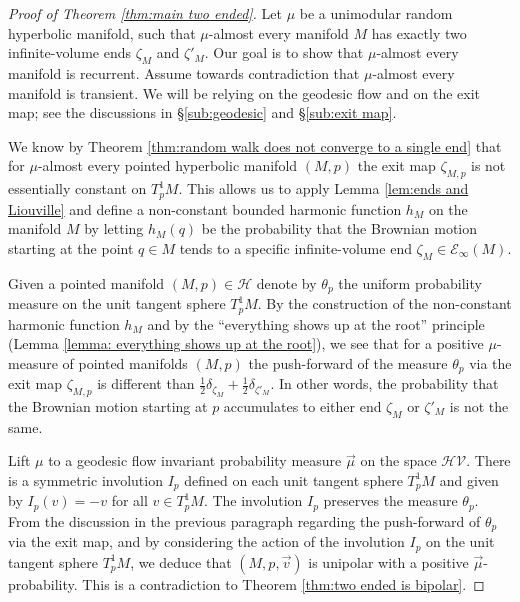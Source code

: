 \documentclass{amsart}
\newcommand{\Hypers}{\mathcal{H}}
\newcommand{\HypersV}{\mathcal{HV}}
\newcommand{\EndsInf}[1]{\mathcal{E}_{\infty}\left(#1\right)}
\theoremstyle{plain}
\numberwithin{equation}{section}
\theoremstyle{definition}
\begin{document}
\begin{proof}[Proof of Theorem \ref{thm:main two ended}]
Let $\mu$ be a unimodular random hyperbolic manifold, such that $\mu$-almost every manifold $M$ has exactly two infinite-volume ends $\zeta_M$ and $\zeta'_M$. 
Our goal is to show that $\mu$-almost every manifold is recurrent. Assume towards contradiction that $\mu$-almost every manifold is transient. 
We will be relying on the geodesic flow and on the exit map; see the discussions in \S\ref{sub:geodesic} and \S\ref{sub:exit map}.

We know by Theorem \ref{thm:random walk does not converge to a single end} that for $\mu$-almost every pointed hyperbolic manifold $(M,p)$ the exit map $\zeta_{M,p}$ is not essentially constant on $T^1_pM$.  This allows us to apply Lemma \ref{lem:ends and Liouville} and define a non-constant bounded harmonic function $h_M$ on the manifold $M$ by letting $h_M(q)$  be the probability that the Brownian motion starting at the point $q \in M$ tends to a specific infinite-volume end $\zeta_M \in \EndsInf{M}$. 

Given a pointed manifold $(M,p)\in \Hypers$ denote by $\theta_p$ the uniform probability measure on the unit tangent sphere $T^1_pM$. 
By the construction of the non-constant harmonic function $h_M$ and by the \enquote{everything shows up at the root} principle (Lemma \ref{lemma: everything shows up at the root}), we see that for a positive $\mu$-measure of pointed manifolds $(M,p)$ the push-forward of the measure $\theta_p$ via the exit map $\zeta_{M,p}$ is different than $\frac{1}{2}\delta_{\zeta_M}+\frac{1}{2} \delta_{\zeta'_M}$. In other words, the probability that the Brownian motion starting at $p$ accumulates to either end $\zeta_M$ or $\zeta'_M$ is not the same.

Lift $\mu$ to a geodesic flow invariant probability measure $\vec \mu$ on the space $\HypersV$. 
There is a symmetric involution $I_p$ defined on each unit tangent sphere $T^1_pM$ and given by $I_p(v)=-v$ for all $v \in T^1_pM$. The involution $I_p$ preserves the measure $\theta_p$. 
From the discussion in the previous paragraph regarding the push-forward of $\theta_p$ via the exit map, and by considering the action of the involution $I_p$ on the unit tangent sphere $T^1_pM$, we deduce that $(M,p,\vec v)$ is unipolar with a positive $\vec \mu$-probability. This is a contradiction to Theorem \ref{thm:two ended is bipolar}.
\end{proof}
\end{document}
